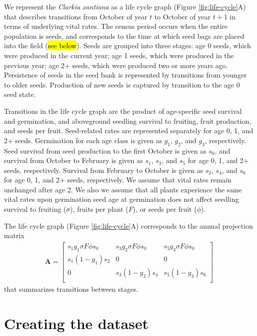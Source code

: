 \documentclass[12pt, oneside, titlepage]{article}   	%
\begin{document}
We represent the \textit{Clarkia xantiana} as a life cycle graph (Figure \ref{fig:life-cycle}A) that describes transitions from October of year $t$ to October of year $t+1$ in terms of underlying vital rates. The census period occurs when the entire population is seeds, and corresponds to the time at which seed bags are placed into the field (\hl{see below}). Seeds are grouped into three stages: age 0 seeds, which were produced in the current year; age 1 seeds, which were produced in the previous year; age 2+ seeds, which were produced two or more years ago. Persistence of seeds in the seed bank is represented by transitions from younger to older seeds. Production of new seeds is captured by transition to the age 0 seed state. 

Transitions in the life cycle graph are the product of age-specific seed survival and germination, and aboveground seedling survival to fruiting, fruit production, and seeds per fruit. Seed-related rates are represented separately for age 0, 1, and 2+ seeds. Germination for each age class is given as $g_1$, $g_2$, and $g_3$, respectively. Seed survival from seed production to the first October is given as $s_0$, and survival from October to February is given as $s_1$, $s_3$, and $s_5$ for age 0, 1, and 2+ seeds, respectively. Survival from February to October is given as $s_2$, $s_4$, and $s_6$ for age 0, 1, and 2+ seeds, respectively. We assume that vital rates remain unchanged after age 2. We also we assume that all plants experience the same vital rates upon germination seed age at germination does not affect seedling survival to fruiting ($\sigma$), fruits per plant ($F$), or seeds per fruit ($\phi$).

The life cycle graph (Figure \ref{fig:life-cycle}A) corresponds to the annual projection matrix
%
\begin{gather}
\bm{A} = 
\begin{bmatrix} 
s_1 g_1 \sigma F \phi s_0 & s_3 g_2 \sigma F \phi s_0 & s_5 g_3 \sigma F \phi s_0 \\
s_1 (1-g_1) s_2 & 0 & 0 \\
0 & s_3 (1-g_2) s_4  & s_5 (1-g_3) s_6  \\
\end{bmatrix}
\label{eq:projection-matrix}
\end{gather} 
%
that summarizes transitions between stages. 

\section{Creating the dataset}
\end{document}
